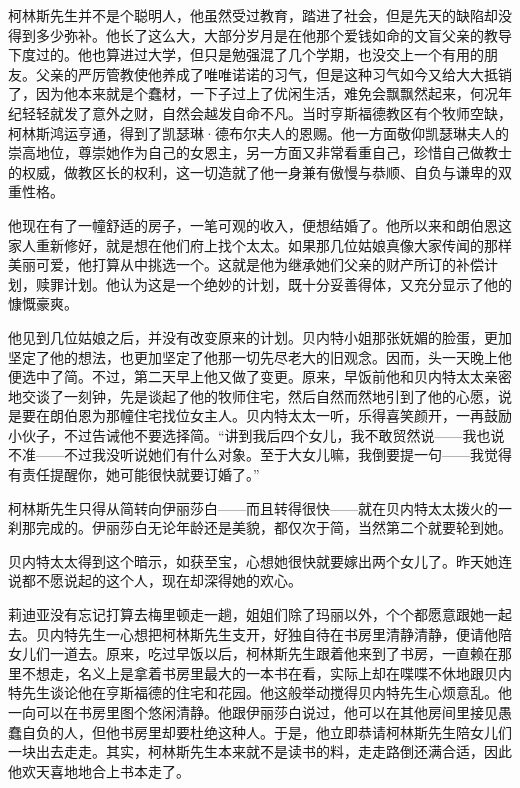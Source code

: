 \par 柯林斯先生并不是个聪明人，他虽然受过教育，踏进了社会，但是先天的缺陷却没得到多少弥补。他长了这么大，大部分岁月是在他那个爱钱如命的文盲父亲的教导下度过的。他也算进过大学，但只是勉强混了几个学期，也没交上一个有用的朋友。父亲的严厉管教使他养成了唯唯诺诺的习气，但是这种习气如今又给大大抵销了，因为他本来就是个蠢材，一下子过上了优闲生活，难免会飘飘然起来，何况年纪轻轻就发了意外之财，自然会越发自命不凡。当时亨斯福德教区有个牧师空缺，柯林斯鸿运亨通，得到了凯瑟琳·德布尔夫人的恩赐。他一方面敬仰凯瑟琳夫人的崇高地位，尊崇她作为自己的女恩主，另一方面又非常看重自己，珍惜自己做教士的权威，做教区长的权利，这一切造就了他一身兼有傲慢与恭顺、自负与谦卑的双重性格。
\par 他现在有了一幢舒适的房子，一笔可观的收入，便想结婚了。他所以来和朗伯恩这家人重新修好，就是想在他们府上找个太太。如果那几位姑娘真像大家传闻的那样美丽可爱，他打算从中挑选一个。这就是他为继承她们父亲的财产所订的补偿计划，赎罪计划。他认为这是一个绝妙的计划，既十分妥善得体，又充分显示了他的慷慨豪爽。
\par 他见到几位姑娘之后，并没有改变原来的计划。贝内特小姐那张妩媚的脸蛋，更加坚定了他的想法，也更加坚定了他那一切先尽老大的旧观念。因而，头一天晚上他便选中了简。不过，第二天早上他又做了变更。原来，早饭前他和贝内特太太亲密地交谈了一刻钟，先是谈起了他的牧师住宅，然后自然而然地引到了他的心愿，说是要在朗伯恩为那幢住宅找位女主人。贝内特太太一听，乐得喜笑颜开，一再鼓励小伙子，不过告诫他不要选择简。“讲到我后四个女儿，我不敢贸然说——我也说不准——不过我没听说她们有什么对象。至于大女儿嘛，我倒要提一句——我觉得有责任提醒你，她可能很快就要订婚了。”
\par 柯林斯先生只得从简转向伊丽莎白——而且转得很快——就在贝内特太太拨火的一刹那完成的。伊丽莎白无论年龄还是美貌，都仅次于简，当然第二个就要轮到她。
\par 贝内特太太得到这个暗示，如获至宝，心想她很快就要嫁出两个女儿了。昨天她连说都不愿说起的这个人，现在却深得她的欢心。
\par 莉迪亚没有忘记打算去梅里顿走一趟，姐姐们除了玛丽以外，个个都愿意跟她一起去。贝内特先生一心想把柯林斯先生支开，好独自待在书房里清静清静，便请他陪女儿们一道去。原来，吃过早饭以后，柯林斯先生跟着他来到了书房，一直赖在那里不想走，名义上是拿着书房里最大的一本书在看，实际上却在喋喋不休地跟贝内特先生谈论他在亨斯福德的住宅和花园。他这般举动搅得贝内特先生心烦意乱。他一向可以在书房里图个悠闲清静。他跟伊丽莎白说过，他可以在其他房间里接见愚蠢自负的人，但他书房里却要杜绝这种人。于是，他立即恭请柯林斯先生陪女儿们一块出去走走。其实，柯林斯先生本来就不是读书的料，走走路倒还满合适，因此他欢天喜地地合上书本走了。
